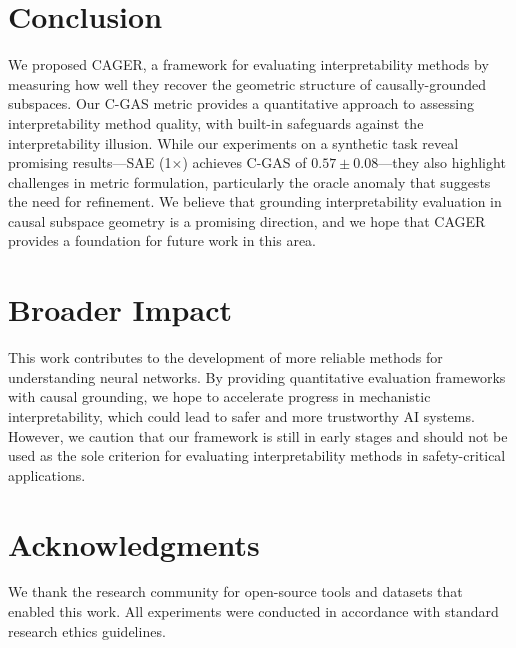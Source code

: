 \documentclass{article}
\begin{document}
\section{Conclusion}

We proposed CAGER, a framework for evaluating interpretability methods by measuring how well they recover the geometric structure of causally-grounded subspaces. Our C-GAS metric provides a quantitative approach to assessing interpretability method quality, with built-in safeguards against the interpretability illusion. While our experiments on a synthetic task reveal promising results---SAE (1$\times$) achieves C-GAS of $0.57 \pm 0.08$---they also highlight challenges in metric formulation, particularly the oracle anomaly that suggests the need for refinement. We believe that grounding interpretability evaluation in causal subspace geometry is a promising direction, and we hope that CAGER provides a foundation for future work in this area.

\section*{Broader Impact}

This work contributes to the development of more reliable methods for understanding neural networks. By providing quantitative evaluation frameworks with causal grounding, we hope to accelerate progress in mechanistic interpretability, which could lead to safer and more trustworthy AI systems. However, we caution that our framework is still in early stages and should not be used as the sole criterion for evaluating interpretability methods in safety-critical applications.

\section*{Acknowledgments}
We thank the research community for open-source tools and datasets that enabled this work. All experiments were conducted in accordance with standard research ethics guidelines.
\end{document}
